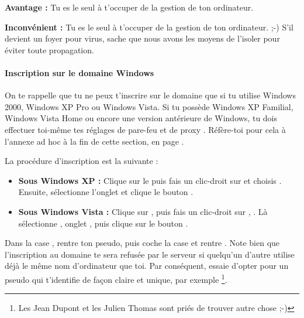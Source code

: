 \textbf{Avantage :} Tu es le seul à t'occuper de la gestion de ton ordinateur.

\textbf{Inconvénient :} Tu es le seul à t'occuper de la gestion de ton ordinateur. ;-)
S'il devient un foyer pour virus, sache que nous avons les moyens de l'isoler
pour éviter toute propagation.

\begin{center}
\end{center}


\paragraph{Inscription sur le domaine Windows}

On te rappelle que tu ne peux t'inscrire sur le domaine que si tu utilise
Windows 2000, Windows XP Pro ou Windows Vista. Si tu possède Windows XP
Familial, Windows Vista Home ou encore une version antérieure de Windows,
tu dois effectuer toi-même tes réglages de pare-feu et de proxy
. Réfère-toi pour cela à l'annexe ad hoc à la fin de
cette section, en page \pageref{horsdomaine}.

La procédure d'inscription est la suivante :
\begin{itemize}

\item \textbf{Sous Windows XP :} Clique sur le  puis fais un clic-droit sur
 et choisis . Ensuite, sélectionne l'onglet  et clique le bouton .

\item \textbf{Sous Windows Vista :} Clique sur , puis fais un clic-droit sur , . Là sélectionne , onglet , puis clique sur le bouton .

\end{itemize}

Dans la case , rentre ton pseudo, puis coche la case  et
rentre . Note bien que l'inscription au domaine te sera
refusée par le serveur si quelqu'un d'autre utilise déjà le même nom d'ordinateur que toi. Par
conséquent, essaie d'opter pour un pseudo qui t'identifie de fa\c{c}on claire et unique, par exemple
 \footnote{Les Jean Dupont et les Julien Thomas sont priés de trouver autre chose
;-)}.

